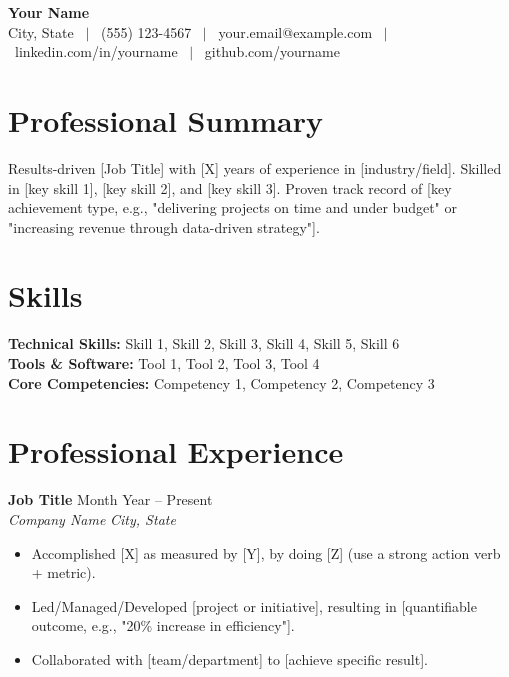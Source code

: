 \documentclass[11pt,letterpaper]{article}
\newcommand{\resumeEntry}[4]{%
    \textbf{#1} \hfill #2 \\
    \textit{#3} \hfill \textit{#4}
}
\begin{document}
\begin{center}
    {\LARGE \textbf{Your Name}} \\[4pt]
    City, State \ $\vert$ \ (555) 123-4567 \ $\vert$ \ your.email@example.com \ $\vert$ \ linkedin.com/in/yourname \ $\vert$ \ github.com/yourname
\end{center}

\vspace{4pt}

\section*{Professional Summary}
Results-driven [Job Title] with [X] years of experience in [industry/field]. Skilled in [key skill 1], [key skill 2], and [key skill 3]. Proven track record of [key achievement type, e.g., "delivering projects on time and under budget" or "increasing revenue through data-driven strategy"].

\section*{Skills}
\textbf{Technical Skills:} Skill 1, Skill 2, Skill 3, Skill 4, Skill 5, Skill 6 \\
\textbf{Tools \& Software:} Tool 1, Tool 2, Tool 3, Tool 4 \\
\textbf{Core Competencies:} Competency 1, Competency 2, Competency 3

\section*{Professional Experience}

\resumeEntry{Job Title}{Month Year -- Present}{Company Name}{City, State}
\begin{itemize}
    \item Accomplished [X] as measured by [Y], by doing [Z] (use a strong action verb + metric).
    \item Led/Managed/Developed [project or initiative], resulting in [quantifiable outcome, e.g., "20\% increase in efficiency"].
    \item Collaborated with [team/department] to [achieve specific result].
\end{itemize}
\end{document}

